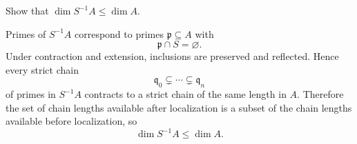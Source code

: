 \begin{problem}\label{prob:vi29-09}
Show that \(\dim S^{-1}A\le\dim A\).

\end{problem}

\ifdefined\FullProblemDossiers
\begin{solution}
Primes of \(S^{-1}A\) correspond to primes \(\mathfrak p\subseteq A\) with
\[
\mathfrak p\cap S=\varnothing.
\]
Under contraction and extension, inclusions are preserved and reflected.  Hence every strict chain
\[
\mathfrak q_0\subsetneq\cdots\subsetneq\mathfrak q_n
\]
of primes in \(S^{-1}A\) contracts to a strict chain of the same length in \(A\).  Therefore the set of chain
lengths available after localization is a subset of the chain lengths available before localization, so
\[
\boxed{\dim S^{-1}A\le\dim A}.
\]
\end{solution}
\fi
